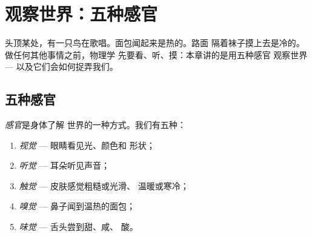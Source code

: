 \chapter{观察世界：五种感官}\label{ch:g1:five-senses}

头顶某处，有一只鸟在歌唱。面包闻起来是热的。路面
隔着袜子摸上去是冷的。做任何其他事情之前，物理学
先要看、听、摸：本章讲的是用五种感官
观察世界 --- 以及它们会如何捉弄我们。

\section{五种感官}

\begin{definition}[五种感官]\label{def:g1:five-senses:senses}
\emph{感官}是身体了解
世界的一种方式。我们有五种：
\begin{enumerate}
  \item \emph{视觉} --- 眼睛看见光、颜色和
        形状；
  \item \emph{听觉} --- 耳朵听见声音；
  \item \emph{触觉} --- 皮肤感觉粗糙或光滑、
        温暖或寒冷；
  \item \emph{嗅觉} --- 鼻子闻到温热的面包；
  \item \emph{味觉} --- 舌头尝到甜、咸、
        酸。
\end{enumerate}
\end{definition}

